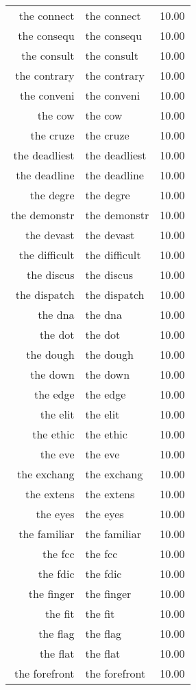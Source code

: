 \begin{table}[ht]
\begin{tabular}{rlr}
  the connect & the connect & 10.00 \\ 
  the consequ & the consequ & 10.00 \\ 
  the consult & the consult & 10.00 \\ 
  the contrary & the contrary & 10.00 \\ 
  the conveni & the conveni & 10.00 \\ 
  the cow & the cow & 10.00 \\ 
  the cruze & the cruze & 10.00 \\ 
  the deadliest & the deadliest & 10.00 \\ 
  the deadline & the deadline & 10.00 \\ 
  the degre & the degre & 10.00 \\ 
  the demonstr & the demonstr & 10.00 \\ 
  the devast & the devast & 10.00 \\ 
  the difficult & the difficult & 10.00 \\ 
  the discus & the discus & 10.00 \\ 
  the dispatch & the dispatch & 10.00 \\ 
  the dna & the dna & 10.00 \\ 
  the dot & the dot & 10.00 \\ 
  the dough & the dough & 10.00 \\ 
  the down & the down & 10.00 \\ 
  the edge & the edge & 10.00 \\ 
  the elit & the elit & 10.00 \\ 
  the ethic & the ethic & 10.00 \\ 
  the eve & the eve & 10.00 \\ 
  the exchang & the exchang & 10.00 \\ 
  the extens & the extens & 10.00 \\ 
  the eyes & the eyes & 10.00 \\ 
  the familiar & the familiar & 10.00 \\ 
  the fcc & the fcc & 10.00 \\ 
  the fdic & the fdic & 10.00 \\ 
  the finger & the finger & 10.00 \\ 
  the fit & the fit & 10.00 \\ 
  the flag & the flag & 10.00 \\ 
  the flat & the flat & 10.00 \\ 
  the forefront & the forefront & 10.00 \\ 

\end{tabular}
\end{table}
